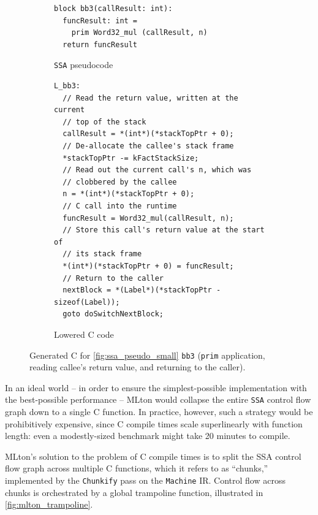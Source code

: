 \begin{figure}[htbp]
  \centering
  \begin{subfigure}[t]{0.42\textwidth}
    \caption{\texttt{SSA} pseudocode}
    \label{fig:ssa_pseudo_small_bb3}
    \vspace{1mm}
\begin{verbatim}
block bb3(callResult: int):
  funcResult: int =
    prim Word32_mul (callResult, n)
  return funcResult
\end{verbatim}
  \end{subfigure}\hfill
  \begin{subfigure}[t]{0.55\textwidth}
    \caption{Lowered C code}
    \label{fig:c_pseudo_small_bb3}
    \vspace{1mm}
\begin{verbatim}
L_bb3:
  // Read the return value, written at the current
  // top of the stack
  callResult = *(int*)(*stackTopPtr + 0);
  // De-allocate the callee's stack frame
  *stackTopPtr -= kFactStackSize;
  // Read out the current call's n, which was
  // clobbered by the callee
  n = *(int*)(*stackTopPtr + 0);
  // C call into the runtime
  funcResult = Word32_mul(callResult, n);
  // Store this call's return value at the start of
  // its stack frame
  *(int*)(*stackTopPtr + 0) = funcResult;
  // Return to the caller
  nextBlock = *(Label*)(*stackTopPtr - sizeof(Label));
  goto doSwitchNextBlock;
\end{verbatim}
  \end{subfigure}
  \caption{Generated C for \cref{fig:ssa_pseudo_small} \texttt{bb3} (\texttt{prim} application, reading callee's return value, and returning to the caller).}
  \label{fig:pseudo_small_bb3}
\end{figure}

In an ideal world -- in order to ensure the simplest-possible implementation
with the best-possible performance -- MLton would collapse the entire
\texttt{SSA} control flow graph down to a single C function. In practice,
however, such a strategy would be prohibitively expensive, since C compile times
scale superlinearly with function length: even a modestly-sized benchmark might
take 20 minutes to compile.

MLton's solution to the problem of C compile times is to split the SSA control
flow graph across multiple C functions, which it refers to as ``chunks,''
implemented by the \texttt{Chunkify} pass on the \texttt{Machine} IR. Control
flow across chunks is orchestrated by a global trampoline function, illustrated
in \cref{fig:mlton_trampoline}.


